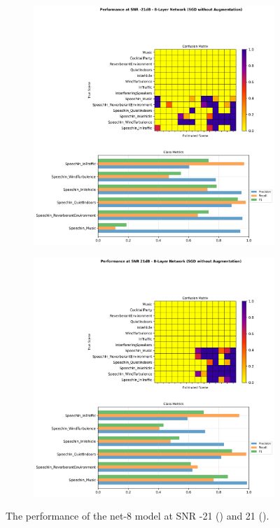 \documentclass[logo,bsc,singlespacing,parskip,online]{infthesis}
\begin{document}
\begin{figure}[h]
   \centering
   \begin{subfigure}[b]{0.48\textwidth}
      \centering
      \includegraphics[width=\textwidth]{net-8/FIXED-fixed-lr-sgd/snr_-21_performance.png}
      \caption{}
      \label{fig:fixed-lr-sgd-snr--21}
   \end{subfigure}
   \hfill
   \begin{subfigure}[b]{0.48\textwidth}
      \centering
      \includegraphics[width=\textwidth]{net-8/FIXED-fixed-lr-sgd/snr_21_performance.png}
      \caption{}
      \label{fig:fixed-lr-sgd-snr-21}
   \end{subfigure}
   \caption{The performance of the net-8 model at SNR -21 () and 21 ().}
\end{figure}
\end{document}
